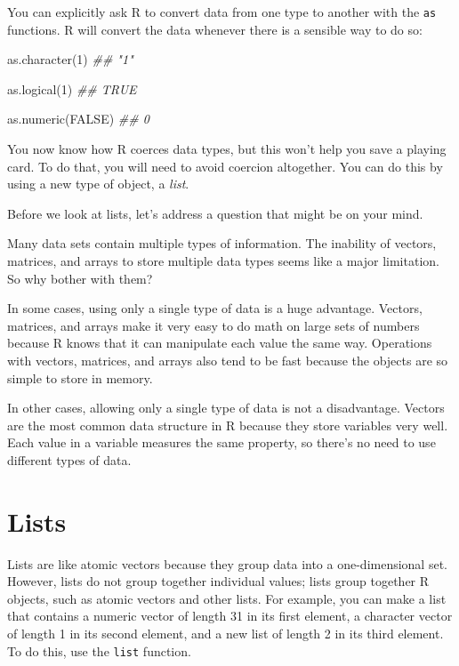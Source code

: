\documentclass[
  letterpaper,
  DIV=11,
  numbers=noendperiod]{scrbook}
\newenvironment{Shaded}{\begin{snugshade}}{\end{snugshade}}
\newcommand{\ConstantTok}[1]{\textcolor[rgb]{0.56,0.35,0.01}{#1}}
\newcommand{\DecValTok}[1]{\textcolor[rgb]{0.68,0.00,0.00}{#1}}
\newcommand{\DocumentationTok}[1]{\textcolor[rgb]{0.37,0.37,0.37}{\textit{#1}}}
\newcommand{\FunctionTok}[1]{\textcolor[rgb]{0.28,0.35,0.67}{#1}}
\newcommand{\NormalTok}[1]{\textcolor[rgb]{0.00,0.23,0.31}{#1}}
\begin{document}
You can explicitly ask R to convert data from one type to another with
the \texttt{as} functions. R will convert the data whenever there is a
sensible way to do so:

\begin{Shaded}
\begin{Highlighting}[]
\FunctionTok{as.character}\NormalTok{(}\DecValTok{1}\NormalTok{)}
\DocumentationTok{\#\# "1"}

\FunctionTok{as.logical}\NormalTok{(}\DecValTok{1}\NormalTok{)}
\DocumentationTok{\#\# TRUE}

\FunctionTok{as.numeric}\NormalTok{(}\ConstantTok{FALSE}\NormalTok{)}
\DocumentationTok{\#\# 0}
\end{Highlighting}
\end{Shaded}

You now know how R coerces data types, but this won't help you save a
playing card. To do that, you will need to avoid coercion altogether.
You can do this by using a new type of object, a \emph{list}.

Before we look at lists, let's address a question that might be on your
mind.

Many data sets contain multiple types of information. The inability of
vectors, matrices, and arrays to store multiple data types seems like a
major limitation. So why bother with them?

In some cases, using only a single type of data is a huge advantage.
Vectors, matrices, and arrays make it very easy to do math on large sets
of numbers because R knows that it can manipulate each value the same
way. Operations with vectors, matrices, and arrays also tend to be fast
because the objects are so simple to store in memory.

In other cases, allowing only a single type of data is not a
disadvantage. Vectors are the most common data structure in R because
they store variables very well. Each value in a variable measures the
same property, so there's no need to use different types of data.

\section{Lists}\label{lists}

Lists are like atomic vectors because they group data into a
one-dimensional set. However, lists do not group together individual
values; lists group together R objects, such as atomic vectors and other
lists. For example, you can make a list that contains a numeric vector
of length 31 in its first element, a character vector of length 1 in its
second element, and a new list of length 2 in its third element. To do
this, use the \texttt{list} function.
\end{document}
